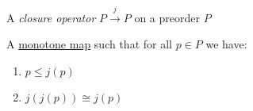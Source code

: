 
A \emph{closure operator} $P \xrightarrow{j} P$ on a preorder $P$

A \href{doc/1 math/Seven Sketches in Compositionality/Chapter 1: Generative Effects/4 Monotone maps/1 Monotone map}{monotone map} such that for all $p \in P$ we have:
\begin{enumerate}
  \item $p \leq j(p)$
  \item $j(j(p)) \cong j(p)$
\end{enumerate}
